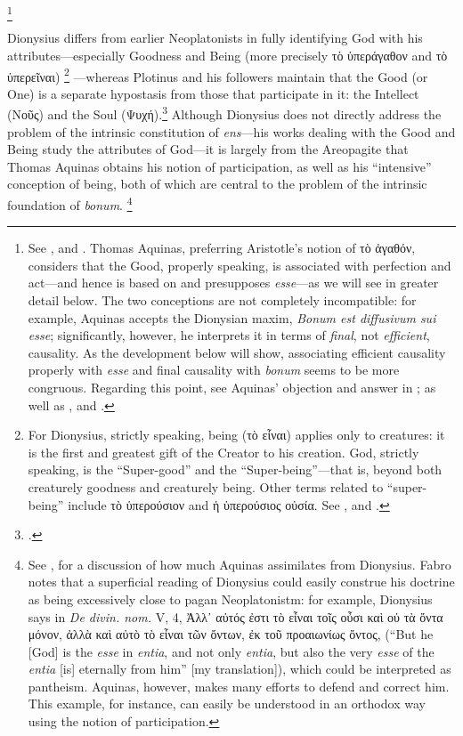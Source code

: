 %
\footnote{See \cite[89]{fabro:nozione}, and \cite[160]{definance:connaissance}. Thomas Aquinas, preferring Aristotle’s notion of τὸ ἀγαθόν, considers that the Good, properly speaking, is associated with perfection and act—and hence is based on and presupposes \emph{esse}—as we will see in greater detail below. The two conceptions are not completely incompatible: for example, Aquinas accepts the Dionysian maxim, \emph{Bonum est diffusivum sui esse}; significantly, however, he interprets it in terms of \emph{final}, not \emph{efficient}, causality. As the development below will show, associating efficient causality properly with \emph{esse} and final causality with \emph{bonum} seems to be more congruous. Regarding this point, see Aquinas’ objection and answer in \cite[I, q.~5, a.~4, arg.~2 and ad 2]{st:summa}; as well as \cite[86–87]{orourke:pseudo-dionysius}, and \cite[68]{definance:etre-et-agir}.}
%

Dionysius differs from earlier Neoplatonists in fully identifying God with his attributes—especially Goodness and Being (more precisely τὸ ὑπερ\-άγαθον and τὸ ὑπερ\-εῖναι)%
%
\footnote{For Dionysius, strictly speaking, being (τὸ εἶναι) applies only to creatures: it is the first and greatest gift of the Creator to his creation. God, strictly speaking, is the “Super-good” and the “Super-being”—that is, beyond both creaturely goodness and creaturely being. Other terms related to “super-being” include  τὸ ὑπερ\-ούσιον and ἡ ὑπερ\-ούσιος οὐσία. See \cite[II, 3; V, 1; and V, 5]{pg:dionysius:DN}, and \cite[69]{orourke:pseudo-dionysius}.}
%
—whereas Plotinus and his followers maintain that the Good (or One) is a separate hypostasis from those that participate in it: the Intellect (Νοῦς) and the Soul (Ψυχή).\footcite[136–137]{fpascual:plotinus} Although Dionysius does not directly address the problem of the intrinsic constitution of \emph{ens}—his works dealing with the Good and Being study the attributes of God—it is largely from the Areopagite that Thomas Aquinas obtains his notion of participation, as well as his “intensive” conception of being, both of which are central to the problem of the intrinsic foundation of \emph{bonum}.%
%
\footnote{See \cite[90-98]{fabro:nozione}, for a discussion of how much Aquinas assimilates from Dionysius. Fabro notes that a superficial reading of Dionysius could easily construe his doctrine as being excessively close to pagan Neoplatonistm: for example, Dionysius says in \emph{De divin. nom.} V, 4, Ἀλλ᾿ αὐτός ἐστι τὸ εἶναι τοῖς οὖσι καὶ οὐ τὰ ὄντα μόνον, ἀλλὰ καὶ αὐτὸ τὸ εἶναι τῶν ὄντων, ἐκ τοῦ προαιωνίως ὄντος, (“But he [God] is the \emph{esse} in \emph{entia}, and not only \emph{entia}, but also the very \emph{esse} of the \emph{entia} [is] eternally from him” [my translation]), which could be interpreted as pantheism. Aquinas, however, makes many efforts to defend and correct him. This example, for instance, can easily be understood in an orthodox way using the notion of participation.} 
%


